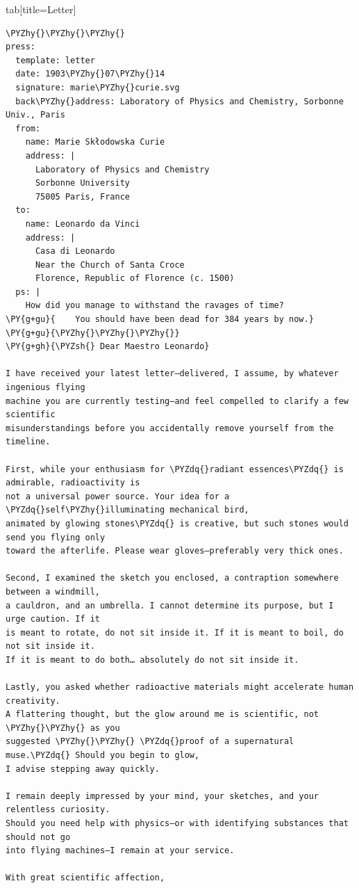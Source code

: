 \documentclass[a4paper,twoside]{article}
\begin{document}
\begin{tsdiv}{tab}[title=Letter]
\begin{tscode}[lang=markdown, engine=pygments]
\begin{Verbatim}[commandchars=\\\{\},breaklines, breakanywhere, commandchars=\\\{\}]
\PYZhy{}\PYZhy{}\PYZhy{}
press:
  template: letter
  date: 1903\PYZhy{}07\PYZhy{}14
  signature: marie\PYZhy{}curie.svg
  back\PYZhy{}address: Laboratory of Physics and Chemistry, Sorbonne Univ., Paris
  from:
    name: Marie Skłodowska Curie
    address: |
      Laboratory of Physics and Chemistry
      Sorbonne University
      75005 Paris, France
  to:
    name: Leonardo da Vinci
    address: |
      Casa di Leonardo
      Near the Church of Santa Croce
      Florence, Republic of Florence (c. 1500)
  ps: |
    How did you manage to withstand the ravages of time?
\PY{g+gu}{    You should have been dead for 384 years by now.}
\PY{g+gu}{\PYZhy{}\PYZhy{}\PYZhy{}}
\PY{g+gh}{\PYZsh{} Dear Maestro Leonardo}

I have received your latest letter—delivered, I assume, by whatever ingenious flying
machine you are currently testing—and feel compelled to clarify a few scientific
misunderstandings before you accidentally remove yourself from the timeline.

First, while your enthusiasm for \PYZdq{}radiant essences\PYZdq{} is admirable, radioactivity is
not a universal power source. Your idea for a \PYZdq{}self\PYZhy{}illuminating mechanical bird,
animated by glowing stones\PYZdq{} is creative, but such stones would send you flying only
toward the afterlife. Please wear gloves—preferably very thick ones.

Second, I examined the sketch you enclosed, a contraption somewhere between a windmill,
a cauldron, and an umbrella. I cannot determine its purpose, but I urge caution. If it
is meant to rotate, do not sit inside it. If it is meant to boil, do not sit inside it.
If it is meant to do both… absolutely do not sit inside it.

Lastly, you asked whether radioactive materials might accelerate human creativity.
A flattering thought, but the glow around me is scientific, not \PYZhy{}\PYZhy{} as you
suggested \PYZhy{}\PYZhy{} \PYZdq{}proof of a supernatural muse.\PYZdq{} Should you begin to glow,
I advise stepping away quickly.

I remain deeply impressed by your mind, your sketches, and your relentless curiosity.
Should you need help with physics—or with identifying substances that should not go
into flying machines—I remain at your service.

With great scientific affection,
\end{Verbatim}
\end{tscode}
\end{tsdiv}
\end{document}
